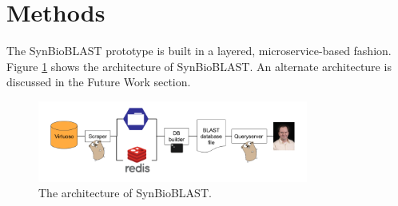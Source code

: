 \documentclass[journal,comsoc]{IEEEtran}
\begin{document}
%





\section{Methods}

The SynBioBLAST prototype is built in a layered, microservice-based 
fashion. Figure \ref{architecture} shows the architecture of SynBioBLAST.
An alternate architecture is discussed in the Future Work section.

\begin{figure}[!t]
\centering
\includegraphics[width=3.5in]{actualarchitecture}
\caption{The architecture of SynBioBLAST.}
\label{architecture}
\end{figure}
\end{document}
